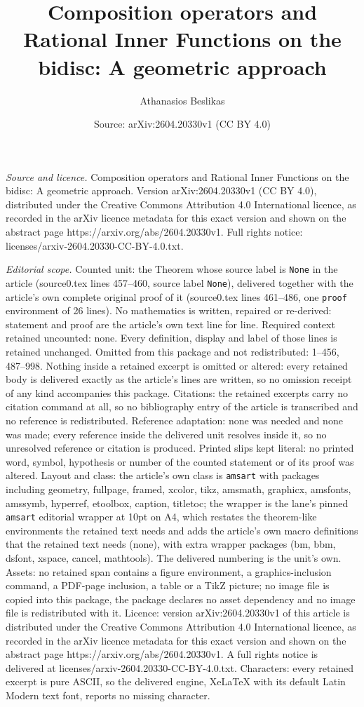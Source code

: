 \documentclass[10pt,a4paper]{amsart}
\title[Composition operators and Rational Inner Functions on the bi]{Composition operators and Rational Inner Functions on the bidisc: A geometric approach}
\author{Athanasios Beslikas}
\date{Source: arXiv:2604.20330v1 (CC BY 4.0)}
\begin{document}
\maketitle

\noindent\emph{Source and licence.} Composition operators and Rational Inner Functions on the bidisc: A geometric approach. Version arXiv:2604.20330v1 (CC BY 4.0), distributed under the Creative Commons Attribution 4.0 International licence, as recorded in the arXiv licence metadata for this exact version and shown on the abstract page https://arxiv.org/abs/2604.20330v1. Full rights notice: licenses/arxiv-2604.20330-CC-BY-4.0.txt.\par\smallskip

\noindent\textit{Editorial scope.} Counted unit: the Theorem whose source label is \texttt{None} in the article (source0.tex lines 457--460, source label \texttt{None}), delivered together with the article's own complete original proof of it (source0.tex lines 461--486, one \texttt{proof} environment of 26 lines). No mathematics is written, repaired or re-derived: statement and proof are the article's own text line for line. Required context retained uncounted: none. Every definition, display and label of those lines is retained unchanged. Omitted from this package and not redistributed: 1--456, 487--998. Nothing inside a retained excerpt is omitted or altered: every retained body is delivered exactly as the article's lines are written, so no omission receipt of any kind accompanies this package. Citations: the retained excerpts carry no citation command at all, so no bibliography entry of the article is transcribed and no reference is redistributed. Reference adaptation: none was needed and none was made; every reference inside the delivered unit resolves inside it, so no unresolved reference or citation is produced. Printed slips kept literal: no printed word, symbol, hypothesis or number of the counted statement or of its proof was altered. Layout and class: the article's own class is \texttt{amsart} with packages including geometry, fullpage, framed, xcolor, tikz, amsmath, graphicx, amsfonts, amssymb, hyperref, etoolbox, caption, titletoc; the wrapper is the lane's pinned \texttt{amsart} editorial wrapper at 10pt on A4, which restates the theorem-like environments the retained text needs and adds the article's own macro definitions that the retained text needs (none), with extra wrapper packages (bm, bbm, dsfont, xspace, cancel, mathtools). The delivered numbering is the unit's own. Assets: no retained span contains a figure environment, a graphics-inclusion command, a PDF-page inclusion, a table or a TikZ picture; no image file is copied into this package, the package declares no asset dependency and no image file is redistributed with it. Licence: version arXiv:2604.20330v1 of this article is distributed under the Creative Commons Attribution 4.0 International licence, as recorded in the arXiv licence metadata for this exact version and shown on the abstract page https://arxiv.org/abs/2604.20330v1. A full rights notice is delivered at licenses/arxiv-2604.20330-CC-BY-4.0.txt. Characters: every retained excerpt is pure ASCII, so the delivered engine, XeLaTeX with its default Latin Modern text font, reports no missing character.
\end{document}
